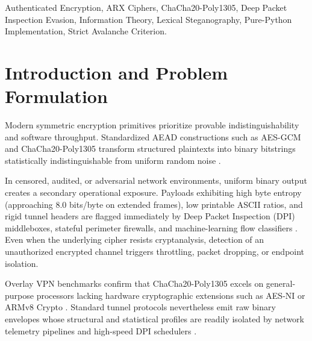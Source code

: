 \documentclass[conference]{IEEEtran}
\begin{document}
\begin{IEEEkeywords}
Authenticated Encryption, ARX Ciphers, ChaCha20-Poly1305, Deep Packet Inspection Evasion, Information Theory, Lexical Steganography, Pure-Python Implementation, Strict Avalanche Criterion.
\end{IEEEkeywords}

\section{Introduction and Problem Formulation}
\label{sec:intro}

Modern symmetric encryption primitives prioritize provable indistinguishability and software throughput. Standardized AEAD constructions such as AES-GCM and ChaCha20-Poly1305 transform structured plaintexts into binary bitstrings statistically indistinguishable from uniform random noise \cite{rfc8439, gentile2024overlay, anyam2025empirical}.

In censored, audited, or adversarial network environments, uniform binary output creates a secondary operational exposure. Payloads exhibiting high byte entropy (approaching $8.0$ bits/byte on extended frames), low printable ASCII ratios, and rigid tunnel headers are flagged immediately by Deep Packet Inspection (DPI) middleboxes, stateful perimeter firewalls, and machine-learning flow classifiers \cite{mohd2026covertchannel, sun2022deep, alazzam2026advanced}. Even when the underlying cipher resists cryptanalysis, detection of an unauthorized encrypted channel triggers throttling, packet dropping, or endpoint isolation.

Overlay VPN benchmarks confirm that ChaCha20-Poly1305 excels on general-purpose processors lacking hardware cryptographic extensions such as AES-NI or ARMv8 Crypto \cite{anyam2025empirical, nianc2022symmetric}. Standard tunnel protocols nevertheless emit raw binary envelopes whose structural and statistical profiles are readily isolated by network telemetry pipelines and high-speed DPI schedulers \cite{jiang2021a, gentile2024overlay}.
\end{document}
